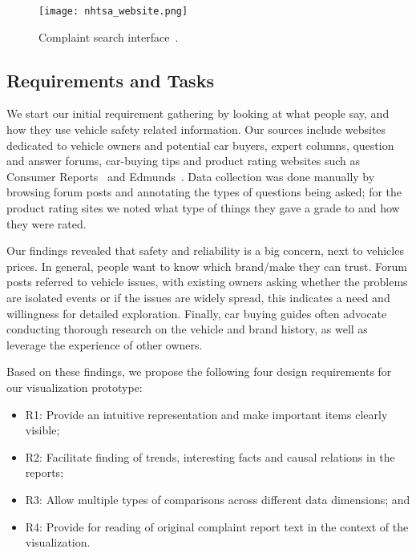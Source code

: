 	\begin{figure}
	   \centering  
	   \texttt{[image: nhtsa\_website.png]}
	   \caption{Complaint search interface~\cite{nhtsa}.}
	   \label{figure:nhtsa}
	\end{figure}



\subsection{Requirements and Tasks}

We start our initial requirement gathering by looking at what people say, and
how they use vehicle safety related information. Our sources include websites 
dedicated to vehicle owners and potential car buyers, expert columns, 
question and answer forums, car-buying tips and product rating websites such 
as Consumer Reports~\cite{consumerReports} and Edmunds~\cite{edmunds}. Data
collection was done manually by browsing forum posts and annotating the types of
questions being asked; for the product rating sites we noted what type of things
they gave a grade to and how they were rated.


Our findings revealed that safety and reliability is a big concern, next to
vehicles prices. In general, people want to know which brand/make 
they can trust. Forum posts referred to vehicle issues, with existing owners 
asking whether the problems are isolated events or if the issues are widely
spread, this indicates a need and willingness for detailed exploration. Finally, car buying 
guides often advocate conducting thorough research on the vehicle and brand history, 
as well as leverage the experience of other owners. 
 
Based on these findings, we propose the following four design requirements for
our visualization prototype:
\begin{itemize}[noitemsep]
  \item R1: Provide an intuitive representation and make important items clearly
  visible;
  \item R2: Facilitate finding of trends, interesting facts and causal relations
  in the reports;
  \item R3: Allow multiple types of comparisons across different data
  dimensions; and
  \item R4: Provide for reading of original complaint report text in the context
  of the visualization.
\end{itemize}

